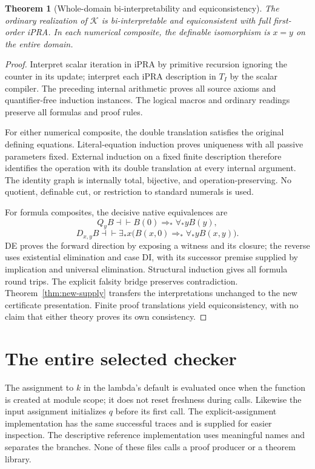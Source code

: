 \documentclass[11pt,letterpaper]{article}
\newtheorem{theorem}{Theorem}[section]
\theoremstyle{definition}\newtheorem{definition}[theorem]{Definition}
\theoremstyle{remark}\newtheorem{remark}[theorem]{Remark}
\newcommand{\Kcal}{\mathcal K}
\begin{document}
\begin{theorem}[Whole-domain bi-interpretability and equiconsistency]
\label{thm:biinterp}
The ordinary realization of $\Kcal$ is bi-interpretable and equiconsistent
with full first-order iPRA. In each numerical composite, the definable
isomorphism is $x=y$ on the entire domain.
\end{theorem}
\begin{proof}
Interpret scalar iteration in iPRA by primitive recursion ignoring the
counter in its update; interpret each iPRA description in $T_I$ by the
scalar compiler. The preceding internal arithmetic proves all source
axioms and quantifier-free induction instances. The logical macros and
ordinary readings preserve all formulas and proof rules.

For either numerical composite, the double translation satisfies the
original defining equations. Literal-equation induction proves uniqueness
with all passive parameters fixed. External induction on a fixed finite
description therefore identifies the operation with its double
translation at every internal argument. The identity graph is internally
total, bijective, and operation-preserving. No quotient, definable cut,
or restriction to standard numerals is used.

For formula composites, the decisive native equivalences are
\[
 Q_yB\dashv\vdash B(0)\Rightarrow_*\forall_*yB(y),
\]
\[
 D_{x,y}B\dashv\vdash
 \exists_*x\bigl(B(x,0)\Rightarrow_*\forall_*yB(x,y)\bigr).
\]
DE proves the forward direction by exposing a witness and its closure;
the reverse uses existential elimination and case DI, with its successor
premise supplied by implication and universal elimination. Structural
induction gives all formula round trips. The explicit falsity bridge
preserves contradiction. Theorem~\ref{thm:new-supply} transfers the
interpretations unchanged to the new certificate presentation. Finite
proof translations yield equiconsistency, with no claim that either
theory proves its own consistency.
\end{proof}

\section{The entire selected checker}
\label{sec:checker}



The assignment to $k$ in the lambda's default is evaluated once when the
function is created at module scope; it does not reset freshness during
calls. Likewise the input assignment initializes $q$ before its first
call. The explicit-assignment implementation has the same successful
traces and is supplied for easier inspection. The descriptive reference
implementation uses meaningful names and separates the branches. None
of these files calls a proof producer or a theorem library.
\end{document}
